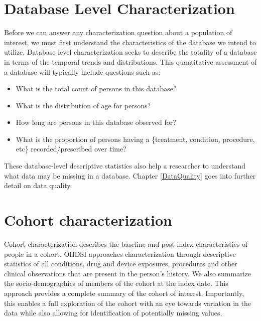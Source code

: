 \documentclass[11pt]{book}
\providecommand{\tightlist}{%
  \setlength{\itemsep}{0pt}\setlength{\parskip}{0pt}}
\theoremstyle{definition}
\theoremstyle{definition}
\theoremstyle{definition}
\theoremstyle{remark}
\begin{document}
\hypertarget{database-level-characterization}{%
\section{Database Level Characterization}\label{database-level-characterization}}

Before we can answer any characterization question about a population of interest, we must first understand the characteristics of the database we intend to utilize. Database level characterization seeks to describe the totality of a database in terms of the temporal trends and distributions. This quantitative assessment of a database will typically include questions such as:

\begin{itemize}
\tightlist
\item
  What is the total count of persons in this database?
\item
  What is the distribution of age for persons?
\item
  How long are persons in this database observed for?
\item
  What is the proportion of persons having a \{treatment, condition, procedure, etc\} recorded/prescribed over time?
\end{itemize}

These database-level descriptive statistics also help a researcher to understand what data may be missing in a database. Chapter \ref{DataQuality} goes into further detail on data quality. 

\hypertarget{cohort-characterization}{%
\section{Cohort characterization}\label{cohort-characterization}}

Cohort characterization describes the baseline and post-index characteristics of people in a cohort. OHDSI approaches characterization through descriptive statistics of all conditions, drug and device exposures, procedures and other clinical observations that are present in the person's history. We also summarize the socio-demographics of members of the cohort at the index date. This approach provides a complete summary of the cohort of interest. Importantly, this enables a full exploration of the cohort with an eye towards variation in the data while also allowing for identification of potentially missing values.
\end{document}
